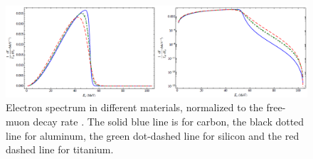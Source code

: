 \documentclass[12pt,a4paper,openright, oneside, titlepage]{book} %
\begin{document}
\begin{figure}[h!]
\centering
\includegraphics[scale=0.8]{DIO_materials}
\caption{Electron spectrum in different materials, normalized to the free-muon decay rate \cite{signorelli}. The solid blue line is for carbon, the black dotted line for aluminum, the green dot-dashed line for silicon and the red dashed line for titanium.}
\label{_DIO_pre}
\end{figure}
\end{document}
